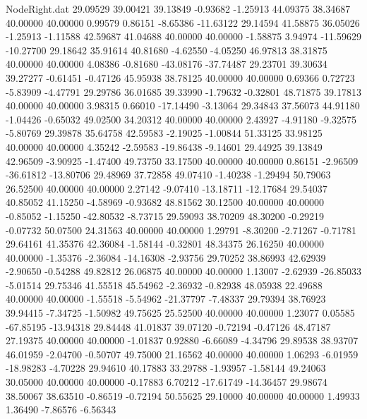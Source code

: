 \begin{filecontents}{NodeRight.dat}
  29.09529   39.00421   39.13849    -0.93682   -1.25913   44.09375   38.34687   40.00000   40.00000    0.99579    0.86151   -8.65386  -11.63122
  29.14594   41.58875   36.05026    -1.25913   -1.11588   42.59687   41.04688   40.00000   40.00000   -1.58875    3.94974  -11.59629  -10.27700
  29.18642   35.91614   40.81680    -4.62550   -4.05250   46.97813   38.31875   40.00000   40.00000    4.08386   -0.81680  -43.08176  -37.74487
  29.23701   39.30634   39.27277    -0.61451   -0.47126   45.95938   38.78125   40.00000   40.00000    0.69366    0.72723   -5.83909   -4.47791
  29.29786   36.01685   39.33990    -1.79632   -0.32801   48.71875   39.17813   40.00000   40.00000    3.98315    0.66010  -17.14490   -3.13064
  29.34843   37.56073   44.91180    -1.04426   -0.65032   49.02500   34.20312   40.00000   40.00000    2.43927   -4.91180   -9.32575   -5.80769
  29.39878   35.64758   42.59583    -2.19025   -1.00844   51.33125   33.98125   40.00000   40.00000    4.35242   -2.59583  -19.86438   -9.14601
  29.44925   39.13849   42.96509    -3.90925   -1.47400   49.73750   33.17500   40.00000   40.00000    0.86151   -2.96509  -36.61812  -13.80706
  29.48969   37.72858   49.07410    -1.40238   -1.29494   50.79063   26.52500   40.00000   40.00000    2.27142   -9.07410  -13.18711  -12.17684
  29.54037   40.85052   41.15250    -4.58969   -0.93682   48.81562   30.12500   40.00000   40.00000   -0.85052   -1.15250  -42.80532   -8.73715
  29.59093   38.70209   48.30200    -0.29219   -0.07732   50.07500   24.31563   40.00000   40.00000    1.29791   -8.30200   -2.71267   -0.71781
  29.64161   41.35376   42.36084    -1.58144   -0.32801   48.34375   26.16250   40.00000   40.00000   -1.35376   -2.36084  -14.16308   -2.93756
  29.70252   38.86993   42.62939    -2.90650   -0.54288   49.82812   26.06875   40.00000   40.00000    1.13007   -2.62939  -26.85033   -5.01514
  29.75346   41.55518   45.54962    -2.36932   -0.82938   48.05938   22.49688   40.00000   40.00000   -1.55518   -5.54962  -21.37797   -7.48337
  29.79394   38.76923   39.94415    -7.34725   -1.50982   49.75625   25.52500   40.00000   40.00000    1.23077    0.05585  -67.85195  -13.94318
  29.84448   41.01837   39.07120    -0.72194   -0.47126   48.47187   27.19375   40.00000   40.00000   -1.01837    0.92880   -6.66089   -4.34796
  29.89538   38.93707   46.01959    -2.04700   -0.50707   49.75000   21.16562   40.00000   40.00000    1.06293   -6.01959  -18.98283   -4.70228
  29.94610   40.17883   33.29788    -1.93957   -1.58144   49.24063   30.05000   40.00000   40.00000   -0.17883    6.70212  -17.61749  -14.36457
  29.98674   38.50067   38.63510    -0.86519   -0.72194   50.55625   29.10000   40.00000   40.00000    1.49933    1.36490   -7.86576   -6.56343

\end{filecontents}
